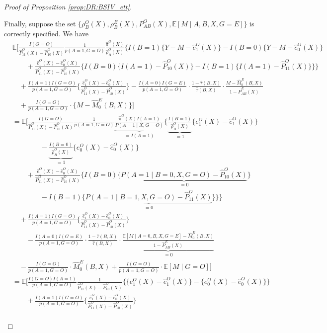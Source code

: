 \documentclass[10pt]{article}
\newcommand{\E}{\mathbb{E}}
\begin{document}
\begin{proof}[Proof of Proposition \ref{prop:DR:BSIV_ett}]
\begin{itemize}
Finally, suppose the set $\{\rho_B^O(X),\rho_B^E(X),P_{AB}^O(X),\mathbb{E}[M\mid A,B,X,G=E]\}$ is correctly specified. We have
\begingroup
\allowdisplaybreaks
{\footnotesize \begin{align*}
&\E\Big[\frac{I(G=O)}{\hat{P}_{11}^O(X)-\hat{P}_{10}^O(X)}\frac{1}{p(A=1,G=O)}\frac{\hat{\pi}^O(X)}{\hat{\rho}_B^O(X)}\bigg\{I(B=1)\{Y-M-\hat{e}_1^O(X)\}-I(B=0)\{Y-M-\hat{e}_0^O(X)\}\\
&\quad\quad+\frac{\hat{e}_1^O(X)-\hat{e}_0^O(X)}{\hat{P}_{11}^O(X)-\hat{P}_{10}^O(X)}\big\{I(B=0)\{I(A=1)-\hat{P}_{10}^O(X)\}-I(B=1)\{I(A=1)-\hat{P}_{11}^O(X)\}\big\}\bigg\}\\
&\quad+\frac{I(A=1)I(G=O)}{p(A=1,G=O)}\Big\{\frac{\hat{e}_1^O(X)-\hat{e}_0^O(X)}{\hat{P}_{11}^O(X)-\hat{P}_{10}^O(X)}\Big\}-\frac{I(A=0)I(G=E)}{p(A=1,G=O)}\cdot\frac{1-\hat{\tau}(B,X)}{\hat{\tau}(B,X)}\cdot
\frac{M-\hat{M}_{0}^{E}(B,X)}{1-\hat{P}_{AB}^E(X)}\\
&\quad+\frac{I(G=O)}{p(A=1,G=O)}\cdot \{M-\hat{M}_{0}^{E}(B,X)\}\Big]\\
&=\E\Big[\frac{I(G=O)}{\hat{P}_{11}^O(X)-\hat{P}_{10}^O(X)}\frac{1}{p(A=1,G=O)}\underbrace{\frac{\hat{\pi}^O(X)I(A=1)}{P(A=1\mid X,G=O)}}_{=I(A=1)}\bigg\{\underbrace{\frac{I(B=1)}{\hat{\rho}_B^O(X)}}_{=1}\{e_1^O(X)-\hat{e}_1^O(X)\}\\
&\quad\quad\quad\quad-\underbrace{\frac{I(B=0)}{\hat{\rho}_B^O(X)}}_{=1}\{e_0^O(X)-\hat{e}_0^O(X)\}\\
&\quad\quad+\frac{\hat{e}_1^O(X)-\hat{e}_0^O(X)}{\hat{P}_{11}^O(X)-\hat{P}_{10}^O(X)}\big\{I(B=0)\{\underbrace{P(A=1\mid B=0,X,G=O)-\hat{P}_{10}^O(X)}_{=0}\}\\
&\quad\quad\quad\quad-I(B=1)\{\underbrace{P(A=1\mid B=1,X,G=O)-\hat{P}_{11}^O(X)}_{=0}\}\big\}\bigg\}\\
&\quad+\frac{I(A=1)I(G=O)}{p(A=1,G=O)}\Big\{\frac{\hat{e}_1^O(X)-\hat{e}_0^O(X)}{\hat{P}_{11}^O(X)-\hat{P}_{10}^O(X)}\Big\}\\
&\quad\quad-\frac{I(A=0)I(G=E)}{p(A=1,G=O)}\cdot\frac{1-\hat{\tau}(B,X)}{\hat{\tau}(B,X)}\cdot
\underbrace{\frac{\mathbb{E}[M\mid A=0,B,X,G=E]-\hat{M}_{0}^{E}(B,X)}{1-\hat{P}_{AB}^E(X)}}_{=0}\\
&\quad-\frac{I(G=O)}{p(A=1,G=O)}\cdot \hat{M}_{0}^{E}(B,X)+\frac{I(G=O)}{p(A=1,G=O)}\cdot \mathbb{E}[M\mid G=O]\Big]\\
&=\E\Big[\frac{I(G=O)I(A=1)}{p(A=1,G=O)}\frac{1}{\hat{P}_{11}^O(X)-\hat{P}_{10}^O(X)}\bigg\{\{e_1^O(X)-\hat{e}_1^O(X)\}-\{e_0^O(X)-\hat{e}_0^O(X)\}\bigg\}\\
&\quad\quad+\frac{I(A=1)I(G=O)}{p(A=1,G=O)}\Big\{\frac{\hat{e}_1^O(X)-\hat{e}_0^O(X)}{\hat{P}_{11}^O(X)-\hat{P}_{10}^O(X)}\Big\}\\

\end{align*}}
\end{itemize}
\end{proof}
\end{document}
